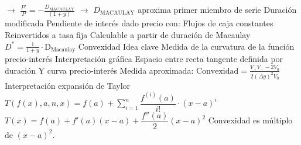 \documentclass{nuevotema}
\begin{document}
\begin{esquemal}
				\4[] $\to$ $\frac{P'}{P} = - \frac{D_\text{MACAULAY}}{(1+y)}$
				\4[] $\to$ $D_\text{MACAULAY}$ aproxima primer miembro de serie
			\3 Duración modificada
				\4 Pendiente de interés dado precio con:
				\4[] Flujos de caja constantes
				\4[] Reinvertidos a tasa fija
				\4 Calculable a partir de duración de Macaulay
				\4 $D^* = \frac{1}{1+y} \cdot \text{D}_\text{Macaulay}$
		\2 Convexidad
			\3 Idea clave
				\4 Medida de la curvatura de la función precio-interés
				\4 Interpretación gráfica
				\4[] Espacio entre recta tangente definida por duración
				\4[] Y curva precio-interés
				\4[] 
				\4 Medida aproximada:
				\4[] $\textrm{Convexidad} = \frac{V_+ V_- - 2V_0}{2(\varDelta y)^2 V_0}$
			\3 Interpretación expansión de Taylor
				\4 $T(f(x), a, n, x) =  f(a) + \sum_{i=1}^n \dfrac{f^{(i)} (a)}{i!} \cdot (x-a)^i$
				\4 $T(x) = f(a) + f'(a) (x-a) + \dfrac{f''(a)}{2} (x-a)^2$
				\4 Convexidad es múltiplo de $(x-a)^2$.


\end{esquemal}
\end{document}
